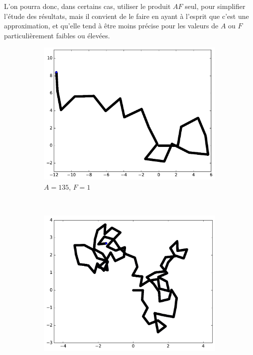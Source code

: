 	
	L'on pourra donc, dans certains cas, utiliser le produit $AF$ seul, pour simplifier l'étude des résultats, mais il convient de le faire en ayant à l'esprit que c'est une approximation, et qu'elle tend à être moins précise pour les valeurs de $A$ ou $F$ particulièrement faibles ou élevées.
	
	\begin{figure}[htb]
		\begin{subfigure}[t]{\subImgWmo}
			\centering
			\includegraphics[width=\textwidth]{figures/ch3/synTraj_219_135_1}
			\caption[$A = 135$, $F=1$]{$A = 135$, $F=1$}
			\label{fig:synTraj_219_135_1}
		\end{subfigure}
		~
		\begin{subfigure}[t]{\subImgWmo}
			\centering
			\includegraphics[width=\textwidth]{figures/ch3/synTraj_219_135_4}

\end{subfigure}
\end{figure}
